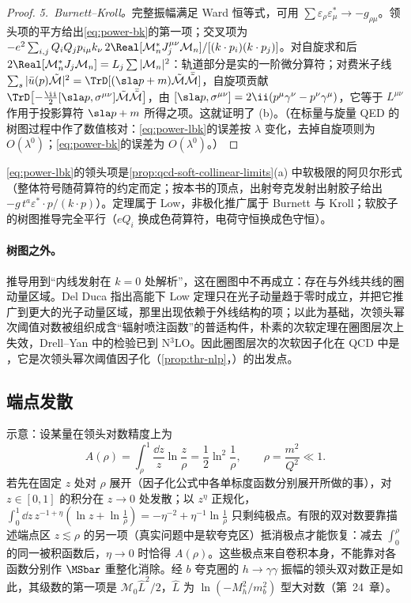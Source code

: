 \begin{proof}
\emph{5.~Burnett--Kroll。}完整振幅满足 Ward 恒等式，可用 $\sum\varepsilon_\rho\varepsilon^*_\mu\to-g_{\rho\mu}$。领头项的平方给出\eqref{eq:power-bk}的第一项；交叉项为 $-e^2\sum_{i,j}Q_iQ_jp_{i\mu}k_\nu\,2\Real[\mathcal M_n^*J_j^{\mu\nu}\mathcal M_n]/[(k\cdot p_i)(k\cdot p_j)]$。对自旋求和后 $2\Real[\mathcal M_n^*J_j\mathcal M_n]=L_j\sum|\mathcal M_n|^2$：轨道部分是实的一阶微分算符；对费米子线 $\sum_s|\bar u(p)\tilde{\mathcal M}|^2=\TrD[(\sla p+m)\tilde{\mathcal M}\bar{\tilde{\mathcal M}}]$，自旋项贡献 $\TrD\big[{-\frac{\ii}{2}}[\sla p,\sigma^{\mu\nu}]\tilde{\mathcal M}\bar{\tilde{\mathcal M}}\big]$，由 $[\sla p,\sigma^{\mu\nu}]=2\ii(p^\mu\gamma^\nu-p^\nu\gamma^\mu)$，它等于 $L^{\mu\nu}$ 作用于投影算符 $\sla p+m$ 所得之项。这就证明了 (b)。（在标量与旋量 QED 的树图过程中作了数值核对：\eqref{eq:power-lbk}的误差按 $\lambda$ 变化，去掉自旋项则为 $O(\lambda^0)$；\eqref{eq:power-bk}的误差为 $O(\lambda^0)$。）
\end{proof}

\eqref{eq:power-lbk}的领头项是\cref{prop:qcd-soft-collinear-limits}(a) 中软极限的阿贝尔形式（整体符号随荷算符的约定而定；按本书的顶点，出射夸克发射出射胶子给出 $-g\,t^a\varepsilon^*\!\cdot p/(k\cdot p)$）。定理属于 Low\cite{Low1958}，非极化推广属于 Burnett 与 Kroll\cite{BurnettKroll1968}；软胶子的树图推导完全平行（$eQ_i$ 换成色荷算符，电荷守恒换成色守恒）。

\paragraph{树图之外。}
推导用到“内线发射在 $k=0$ 处解析”，这在圈图中不再成立：存在与外线共线的圈动量区域。Del Duca 指出高能下 Low 定理只在光子动量趋于零时成立，并把它推广到更大的光子动量区域，那里出现依赖于外线结构的项\cite{DelDuca1990}；以此为基础，次领头幂次阈值对数被组织成含“辐射喷注函数”的普适构件，朴素的次软定理在圈图层次上失效\cite{Bonocore:2015esa,Bonocore:2016awd}，Drell--Yan 中的检验已到 N$^3$LO\cite{Bahjat-Abbas:2018hpv}。因此圈图层次的次软因子化在 QCD 中是 \tagA，它是次领头幂次阈值因子化（\cref{prop:thr-nlp}，\tagP）的出发点。

\subsection{端点发散}

示意：设某量在领头对数精度上为
\begin{equation}\label{eq:power-endpoint-toy}
A(\rho)=\int_\rho^1\frac{\dd z}{z}\ln\frac{z}{\rho}=\frac12\ln^2\frac1\rho,\qquad\rho=\frac{m^2}{Q^2}\ll1 .
\end{equation}
若先在固定 $z$ 处对 $\rho$ 展开（因子化公式中各单标度函数分别展开所做的事），对 $z\in[0,1]$ 的积分在 $z\to0$ 处发散；以 $z^\eta$ 正规化，$\int_0^1\dd z\,z^{-1+\eta}(\ln z+\ln\frac1\rho)=-\eta^{-2}+\eta^{-1}\ln\frac1\rho$ 只剩纯极点。有限的双对数要靠描述端点区 $z\lesssim\rho$ 的另一项（真实问题中是软夸克区）抵消极点才能恢复：减去 $\int_0^\rho$ 的同一被积函数后，$\eta\to0$ 时恰得 $A(\rho)$。这些极点来自卷积本身，不能靠对各函数分别作 $\MSbar$ 重整化消除。经 $b$ 夸克圈的 $h\to\gamma\gamma$ 振幅的领头双对数正是如此，其级数的第一项是 $\mathcal M_0\hat L^2/2$，$\hat L$ 为 $\ln(-M_h^2/m_b^2)$ 型大对数（第~24~章）。%


